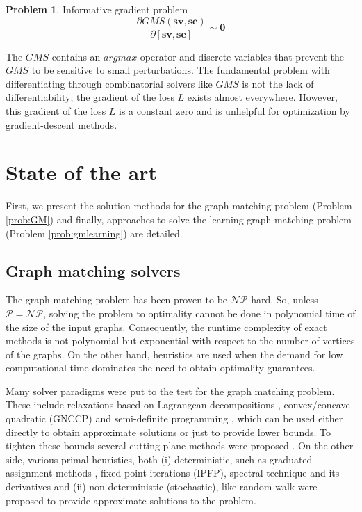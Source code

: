 \documentclass[times,onecolumn,final,authoryear]{article}
\theoremstyle{definition}
\newtheorem{problem}{Problem}
\begin{document}
\begin{problem}{Informative gradient problem}
\label{prob:gradprob}
$$\frac{\partial GMS( \mathbf{sv}, \mathbf{se})}{\partial  [\mathbf{sv}, \mathbf{se}] } \sim \textbf{0}$$

The $GMS$ contains an $argmax$ operator and discrete variables that prevent the $GMS$ to be sensitive to small perturbations. The fundamental problem with differentiating through combinatorial solvers like $GMS$ is not the lack of differentiability; the gradient of the loss $L$ exists almost everywhere. However, this gradient of the loss $L$ is a constant zero and is unhelpful for optimization by gradient-descent methods. 
\end{problem}


\section{State of the art}
\label{sec:stateofheart}
First, we present the solution methods for the graph matching problem (Problem \ref{prob:GM}) and finally, approaches to solve the learning graph matching problem (Problem \ref{prob:gmlearning}) are detailed.

\subsection{Graph matching solvers}
The graph matching problem has been proven to be $\mathcal{NP}$-hard. So, unless  $\mathcal{P} = \mathcal{NP}$, solving the problem to optimality cannot be done in polynomial time of the size of the input graphs. Consequently, the runtime complexity of exact methods is not polynomial but exponential with respect to the number of vertices of the graphs. On the other hand, heuristics are used when the demand for low computational time dominates the need to obtain optimality guarantees.

 Many solver paradigms were put to the test for the graph matching problem. These include relaxations based on Lagrangean decompositions \cite{DBLP:journals/corr/SwobodaRAKS16,messagepassingdualdecomposition}, convex/concave quadratic \cite{gnccp} (GNCCP) and semi-definite programming \cite{pbmatching} , which can be used either directly to obtain approximate solutions or just to provide lower bounds. To tighten these bounds several cutting plane methods were proposed \cite{Bazaraa1982}. On the other side, various primal heuristics, both (i) deterministic, such as graduated assignment methods \cite{graduatedassignment}, fixed point iterations \cite{IPFP} (IPFP), spectral technique and its derivatives \cite{SMACGM,spectralmatching} and (ii) non-deterministic (stochastic), like random walk \cite{reweightedgm} were proposed to provide approximate solutions to the problem. 
 
\end{document}
